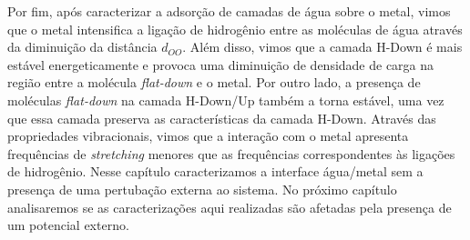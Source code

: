 Por fim, após caracterizar a adsorção de camadas de água sobre o metal, vimos que o metal intensifica a ligação de hidrogênio entre as moléculas de água através da diminuição da distância $ d_{OO} $. Além disso, vimos que a camada H-Down é mais estável energeticamente e provoca uma diminuição de densidade de carga na região entre a molécula \textit{flat-down} e o metal. Por outro lado, a presença de moléculas \textit{flat-down} na camada H-Down/Up também a torna estável, uma vez que essa camada preserva as características da camada H-Down. Através das propriedades vibracionais, vimos que a interação com o metal apresenta frequências de \textit{stretching} menores que as frequências correspondentes às ligações de hidrogênio. Nesse capítulo caracterizamos a interface água/metal sem a presença de uma pertubação externa ao sistema. No próximo capítulo analisaremos se as caracterizações aqui realizadas são afetadas pela presença de um potencial externo.
